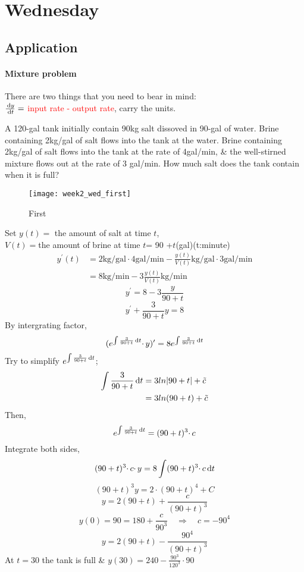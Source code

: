 
\section{Wednesday}
\subsection{Application}
\paragraph{Mixture problem}There are two things that you need to bear in mind: \\\textcolor{red}{$\frac{\,\mathrm{d} y}{\,\mathrm{d} t}=$ input rate - output rate}, carry the units.

\begin{example}
A 120-gal tank initially contain 90kg salt dissoved in 90-gal of water. Brine containing 2kg/gal of salt flows into the tank at the water. Brine containing 2kg/gal of salt flows into the tank at the rate of 4gal/min, \& the well-stirned mixture flows out at the rate of 3 gal/min. How much salt does the tank contain when it is full?
\begin{figure}[H]
\centering
\texttt{[image: week2\_wed\_first]}
\caption{First}
\end{figure}
Set $y(t)=$ the amount of salt at time $t$,\\ $V(t)=$the amount of brine at time $t$= 90 +$t$(gal)(t:minute)\\
\[\begin{aligned}y^\prime(t)&=2\text{kg/gal}\cdotp4\text{gal/min}-\frac{y(t)}{V(t)}\text{kg/gal}\cdotp3\text{gal/min}\\
&=8\text{kg/min}-3\frac{y(t)}{V(t)}\text{kg/min}
\end{aligned}
\]
\[y^\prime=8-3\frac{y}{90+t}
\]
\[y^\prime+\frac{3}{90+t}y=8
\]
By intergrating factor,
\[(e^{\int\frac{3}{90+t}\,\mathrm{d} t}\cdotp y)^\prime=8e^{\int\frac{3}{90+t}\,\mathrm{d} t}
\]
Try to simplify $e^{\int\frac{3}{90+t}\,\mathrm{d} t}$;
\[\begin{aligned}\int\frac{3}{90+t}\,\mathrm{d} t&=3ln|90+t|+\tilde{c}\\&=3ln(90+t)+\tilde{c}\end{aligned}
\]
Then,
\[e^{\int\frac{3}{90+t}\,\mathrm{d} t}=(90+t)^3\cdotp c
\]
Integrate both sides,
\[(90+t)^3\cdotp c\cdotp y=8\int(90+t)^3\cdotp c\,\mathrm{d} t
\]
\[(90+t)^3y=2\cdotp(90+t)^4+C
\]
\[y=2(90+t)+\frac{c}{(90+t)^3}
\]
\[y(0)=90=180+\frac{c}{90^3}\quad\Rightarrow\quad c=-90^4
\]
\[y=2(90+t)-\frac{90^4}{(90+t)^3}
\]
At $t=30$ the tank is full \& $y(30)=240-\frac{90^3}{120^3}\cdotp90$
\end{example}

